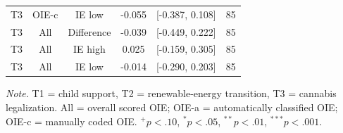 \begin{table}[htbp]
\begin{threeparttable}
\begin{tabular}{lccccc}
  T3 & OIE-c & IE low & -0.055 & [-0.387, 0.108] & 85 \\
  T3 & All & Difference & -0.039 & [-0.449, 0.222] & 85 \\
  T3 & All & IE high & 0.025 & [-0.159, 0.305] & 85 \\
  T3 & All & IE low & -0.014 & [-0.290, 0.203] & 85 \\
\bottomrule
\end{tabular}
\begin{tablenotes}\footnotesize\item \textit{Note.} T1 = child support, T2 = renewable-energy transition, T3 = cannabis legalization. All = overall scored OIE; OIE-a = automatically classified OIE; OIE-c = manually coded OIE. $^{+}p<.10$, $^{*}p<.05$, $^{**}p<.01$, $^{***}p<.001$.\end{tablenotes}
\end{threeparttable}
\end{table}

